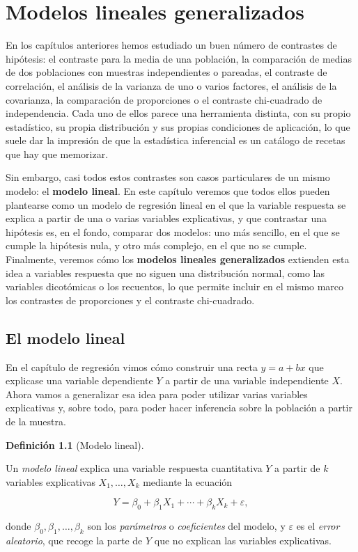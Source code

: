 \documentclass[
  spanish,
  a4paper,
]{scrreport}
\theoremstyle{plain}
\theoremstyle{definition}
\theoremstyle{definition}
\newtheorem{definition}{Definición}[chapter]
\theoremstyle{remark}
\begin{document}

\chapter{Modelos lineales
generalizados}\label{modelos-lineales-generalizados}

En los capítulos anteriores hemos estudiado un buen número de contrastes
de hipótesis: el contraste para la media de una población, la
comparación de medias de dos poblaciones con muestras independientes o
pareadas, el contraste de correlación, el análisis de la varianza de uno
o varios factores, el análisis de la covarianza, la comparación de
proporciones o el contraste chi-cuadrado de independencia. Cada uno de
ellos parece una herramienta distinta, con su propio estadístico, su
propia distribución y sus propias condiciones de aplicación, lo que
suele dar la impresión de que la estadística inferencial es un catálogo
de recetas que hay que memorizar.

Sin embargo, casi todos estos contrastes son casos particulares de un
mismo modelo: el \textbf{modelo lineal}. En este capítulo veremos que
todos ellos pueden plantearse como un modelo de regresión lineal en el
que la variable respuesta se explica a partir de una o varias variables
explicativas, y que contrastar una hipótesis es, en el fondo, comparar
dos modelos: uno más sencillo, en el que se cumple la hipótesis nula, y
otro más complejo, en el que no se cumple. Finalmente, veremos cómo los
\textbf{modelos lineales generalizados} extienden esta idea a variables
respuesta que no siguen una distribución normal, como las variables
dicotómicas o los recuentos, lo que permite incluir en el mismo marco
los contrastes de proporciones y el contraste chi-cuadrado.

\section{El modelo lineal}\label{el-modelo-lineal}

En el capítulo de regresión vimos cómo construir una recta \(y=a+bx\)
que explicase una variable dependiente \(Y\) a partir de una variable
independiente \(X\). Ahora vamos a generalizar esa idea para poder
utilizar varias variables explicativas y, sobre todo, para poder hacer
inferencia sobre la población a partir de la muestra.

\begin{definition}[Modelo
lineal]\protect\hypertarget{def-modelo-lineal}{}\label{def-modelo-lineal}

Un \emph{modelo lineal} explica una variable respuesta cuantitativa
\(Y\) a partir de \(k\) variables explicativas \(X_1,\ldots,X_k\)
mediante la ecuación

\[
Y = \beta_0 + \beta_1 X_1 + \cdots + \beta_k X_k + \varepsilon,
\]

donde \(\beta_0,\beta_1,\ldots,\beta_k\) son los \emph{parámetros} o
\emph{coeficientes} del modelo, y \(\varepsilon\) es el \emph{error
aleatorio}, que recoge la parte de \(Y\) que no explican las variables
explicativas.

\end{definition}
\end{document}
